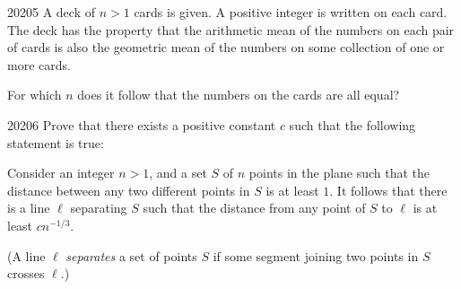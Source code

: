 \begin{problem}{2020}{5}
A deck of $n>1$ cards is given. A positive integer is written on each card. The deck has the property that the arithmetic mean of the numbers on each pair of cards is also the geometric mean of the numbers on some collection of one or more cards.

For which $n$ does it follow that the numbers on the cards are all equal?
\end{problem}

\begin{problem}{2020}{6}
Prove that there exists a positive constant $c$ such that the following statement is true:

Consider an integer $n>1$, and a set $S$ of $n$ points in the plane such that the distance between any two different points in $S$ is at least $1$. It follows that there is a line $\ell$ separating $S$ such that the distance from any point of $S$ to $\ell$ is at least $cn^{-1/3}$.

(A line $\ell$ \emph{separates} a set of points $S$ if some segment joining two points in $S$ crosses $\ell$.)
\end{problem}
